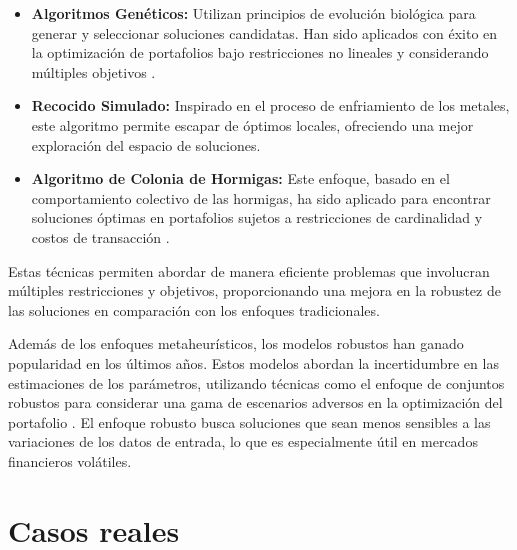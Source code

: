 \documentclass[9pt,a4paper,twoside]{rho-class/rho}
\begin{document}
            \begin{itemize}
                \item \textbf{Algoritmos Genéticos:} Utilizan principios de evolución biológica para generar y seleccionar soluciones candidatas. Han sido aplicados con éxito en la optimización de portafolios bajo restricciones no lineales y considerando múltiples objetivos .
                \item \textbf{Recocido Simulado:} Inspirado en el proceso de enfriamiento de los metales, este algoritmo permite escapar de óptimos locales, ofreciendo una mejor exploración del espacio de soluciones.
                \item \textbf{Algoritmo de Colonia de Hormigas:} Este enfoque, basado en el comportamiento colectivo de las hormigas, ha sido aplicado para encontrar soluciones óptimas en portafolios sujetos a restricciones de cardinalidad y costos de transacción .
            \end{itemize}
        
            \noindent Estas técnicas permiten abordar de manera eficiente problemas que involucran múltiples restricciones y objetivos, proporcionando una mejora en la robustez de las soluciones en comparación con los enfoques tradicionales.
        
            \vspace{2mm}\noindent Además de los enfoques metaheurísticos, los modelos robustos han ganado popularidad en los últimos años. Estos modelos abordan la incertidumbre en las estimaciones de los parámetros, utilizando técnicas como el enfoque de conjuntos robustos para considerar una gama de escenarios adversos en la optimización del portafolio .
            El enfoque robusto busca soluciones que sean menos sensibles a las variaciones de los datos de entrada, lo que es especialmente útil en mercados financieros volátiles.
    \section{Casos reales}
\end{document}
